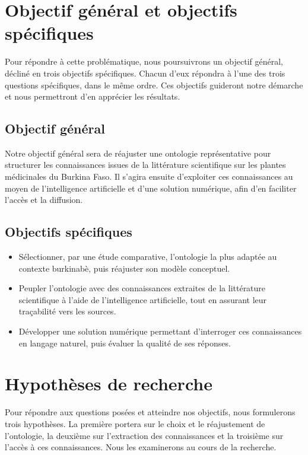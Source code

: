 \section*{Objectif général et objectifs spécifiques}

Pour répondre à cette problématique, nous poursuivrons un objectif général, décliné en trois objectifs spécifiques. Chacun d'eux répondra à l'une des trois questions spécifiques, dans le même ordre. Ces objectifs guideront notre démarche et nous permettront d'en apprécier les résultats.

\subsection*{Objectif général}

Notre objectif général sera de réajuster une ontologie représentative pour structurer les connaissances issues de la littérature scientifique sur les plantes médicinales du Burkina Faso. Il s'agira ensuite d'exploiter ces connaissances au moyen de l'intelligence artificielle et d'une solution numérique, afin d'en faciliter l'accès et la diffusion.

\subsection*{Objectifs spécifiques}

\begin{itemize}
\item Sélectionner, par une étude comparative, l'ontologie la plus adaptée au contexte burkinabè, puis réajuster son modèle conceptuel.
\item Peupler l'ontologie avec des connaissances extraites de la littérature scientifique à l'aide de l'intelligence artificielle, tout en assurant leur traçabilité vers les sources.
\item Développer une solution numérique permettant d'interroger ces connaissances en langage naturel, puis évaluer la qualité de ses réponses.
\end{itemize}

\section*{Hypothèses de recherche}

Pour répondre aux questions posées et atteindre nos objectifs, nous formulerons trois hypothèses. La première portera sur le choix et le réajustement de l'ontologie, la deuxième sur l'extraction des connaissances et la troisième sur l'accès à ces connaissances. Nous les examinerons au cours de la recherche.

